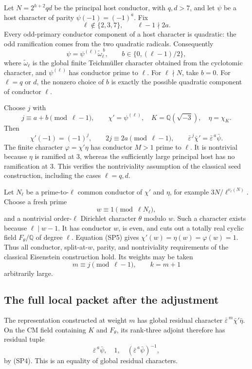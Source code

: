 Let \(N=2^{h+2}qd\) be the principal host conductor, with
\(q,d>7\), and let \(\psi\) be a host character of parity
\(\psi(-1)=(-1)^a\).
Fix
\[
       \ell\notin\{2,3,7\},\qquad
                         \ell-1\nmid2a .
 \tag{SP1}
\]
Every odd-primary conductor component of a host character
is quadratic: the odd ramification comes from the two
quadratic radicals.
Consequently
\[
        \psi=\psi^{(\ell)}\widetilde\omega_\ell^{\,b},
       \qquad b\in\{0,(\ell-1)/2\},
 \tag{SP2}
\]
where \(\widetilde\omega_\ell\) is the global finite
Teichm\"uller character obtained from the cyclotomic character,
and \(\psi^{(\ell)}\) has conductor prime to \(\ell\).
For \(\ell\nmid N\), take \(b=0\).
For \(\ell=q\) or \(d\), the nonzero choice of \(b\) is
exactly the possible quadratic component of conductor \(\ell\).

Choose \(j\) with
\[
                       j\equiv a+b\pmod{\ell-1},
 \qquad
              \chi'=\psi^{(\ell)},\quad
              K=\mathbb Q(\sqrt{-3}),\quad\eta=\chi_K .
 \tag{SP3}
\]
Then
\[
 \chi'(-1)=(-1)^j,\qquad
  2j\equiv2a\pmod{\ell-1},\qquad
       \bar\varepsilon^{\,j}\bar\chi'
                       =\bar\varepsilon^{\,a}\bar\psi .
 \tag{SP4}
\]
The finite character
\(\varphi=\chi'\eta\) has conductor \(M>1\) prime to
\(\ell\).
It is nontrivial because \(\eta\) is ramified at \(3\),
whereas the sufficiently large principal host has no
ramification at \(3\).
This verifies the nontriviality assumption of the classical
seed construction, including the cases \(\ell=q,d\).

Let \(N_\ell\) be a prime-to-\(\ell\) common conductor of
\(\chi'\) and \(\eta\), for example
\(3N/\ell^{v_\ell(N)}\).
Choose a fresh prime
\[
                       w\equiv1\pmod{\ell N_\ell},
 \tag{SP5}
\]
and a nontrivial order-\(\ell\) Dirichlet character
\(\theta\) modulo \(w\).
Such a character exists because \(\ell\mid w-1\).
It has conductor \(w\), is even, and cuts out a totally
real cyclic field \(F_\theta/\mathbb Q\) of degree \(\ell\).
Equation (SP5) gives
\(\chi'(w)=\eta(w)=\varphi(w)=1\).
Thus all conductor, split-at-\(w\), parity, and nontriviality
requirements of the classical Eisenstein construction hold.
Its weights may be taken
\[
                           m\equiv j\pmod{\ell-1},
                         \qquad k=m+1
 \tag{SP6}
\]
arbitrarily large.

\subsection{The full local packet after the adjustment}
The representation constructed at weight \(m\) has global
residual character
\(\bar\varepsilon^{\,m}\bar\chi'\bar\eta\).
On the CM field containing \(K\) and \(F_\theta\), its
rank-three adjoint therefore has residual tuple
\[
        \bar\varepsilon^{\,a}\bar\psi,\quad1,\quad
                      (\bar\varepsilon^{\,a}\bar\psi)^{-1},
 \tag{SP7}
\]
by (SP4).
This is an equality of global residual characters.

